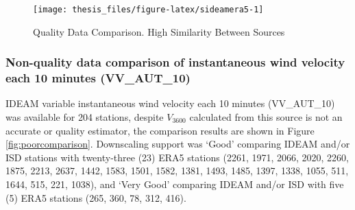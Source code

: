 \documentclass[12pt,twoside]{reedthesis}
\begin{document}
\begin{figure}

{\centering \texttt{[image: thesis\_files/figure-latex/sideamera5-1]} 

}

\caption{Quality Data Comparison. High Similarity Between Sources}\label{fig:sideamera5}
\end{figure}
\hypertarget{non-quality-data-comparison-of-instantaneous-wind-velocity-each-10-minutes-vv_aut_10}{%
\subsubsection{Non-quality data comparison of instantaneous wind velocity each 10 minutes (VV\_AUT\_10)}\label{non-quality-data-comparison-of-instantaneous-wind-velocity-each-10-minutes-vv_aut_10}}

IDEAM variable instantaneous wind velocity each 10 minutes (VV\_AUT\_10) was available for 204 stations, despite \(V_{3600}\) calculated from this source is not an accurate or quality estimator, the comparison results are shown in Figure \ref{fig:poorcomparison}. Downscaling support was `Good' comparing IDEAM and/or ISD stations with twenty-three (23) ERA5 stations (2261, 1971, 2066, 2020, 2260, 1875, 2213, 2637, 1442, 1583, 1501, 1582, 1381, 1493, 1485, 1397, 1338, 1055, 511, 1644, 515, 221, 1038), and `Very Good' comparing IDEAM and/or ISD with five (5) ERA5 stations (265, 360, 78, 312, 416).
\end{document}
